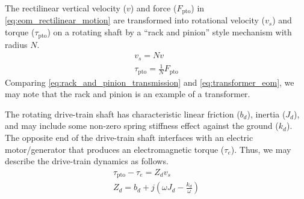 \documentclass[5p,times]{elsarticle}
\begin{document}
The rectilinear vertical velocity ($v$) and force ($F_{\textrm{pto}}$) in \eqref{eq:eom_rectilinear_motion} are transformed into rotational velocity ($v_s$) and torque ($\tau_{\textrm{pto}}$) on a rotating shaft by a ``rack and pinion'' style mechanism with radius $N$.
%
\begin{subequations}
        \begin{gather}
                v_s = N v \\
                \tau_{\textrm{pto}} = \frac{1}{N} F_{\textrm{pto}}
        \end{gather}
        \label{eq:rack_and_pinion_transmission}%
\end{subequations}
%
Comparing \eqref{eq:rack_and_pinion_transmission} and \eqref{eq:transformer_eom}, we may note that the rack and pinion is an example of a transformer.

The rotating drive-train shaft has characteristic linear friction ($b_d$), inertia ($J_d$), and may include some non-zero spring stiffness effect against the ground ($k_d$).
The opposite end of the drive-train shaft interfaces with an electric motor/generator that produces an electromagnetic torque ($\tau_e$).
Thus, we may describe the drive-train dynamics as follows.
%
\begin{subequations}
        \begin{gather}
                \tau_{\textrm{pto}} - \tau_e = Z_d v_s \\
                Z_d = b_d + j \left( \omega J_d - \frac{k_d}{\omega} \right)
        \end{gather}
\end{subequations}
\end{document}
